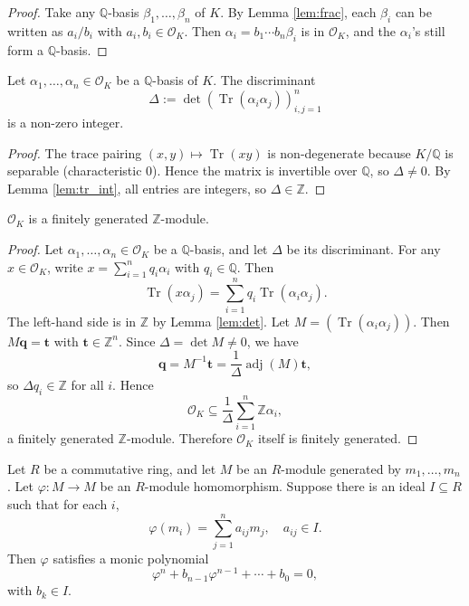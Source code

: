 \begin{proof}
Take any \(\mathbb{Q}\)-basis \(\beta_1, \dots, \beta_n\) of \(K\). By Lemma \ref{lem:frac}, each \(\beta_i\) can be written as \(a_i/b_i\) with \(a_i, b_i \in \mathcal{O}_K\). Then \(\alpha_i = b_1 \cdots b_n \beta_i\) is in \(\mathcal{O}_K\), and the \(\alpha_i\)'s still form a \(\mathbb{Q}\)-basis.
\end{proof}

\begin{lemma}\label{lem:det}
Let \(\alpha_1, \dots, \alpha_n \in \mathcal{O}_K\) be a \(\mathbb{Q}\)-basis of \(K\). The discriminant
\[
\Delta := \det(\operatorname{Tr}(\alpha_i \alpha_j))_{i,j=1}^n
\]
is a non-zero integer.
\end{lemma}

\begin{proof}
The trace pairing \((x, y) \mapsto \operatorname{Tr}(xy)\) is non-degenerate because \(K/\mathbb{Q}\) is separable (characteristic 0). Hence the matrix is invertible over \(\mathbb{Q}\), so \(\Delta \neq 0\). By Lemma \ref{lem:tr_int}, all entries are integers, so \(\Delta \in \mathbb{Z}\).
\end{proof}

\begin{prop}\label{prop:finitely gen mod}
\(\mathcal{O}_K\) is a finitely generated \(\mathbb{Z}\)-module.
\end{prop}

\begin{proof}
Let \(\alpha_1, \dots, \alpha_n \in \mathcal{O}_K\) be a \(\mathbb{Q}\)-basis, and let \(\Delta\) be its discriminant. For any \(x \in \mathcal{O}_K\), write \(x = \sum_{i=1}^n q_i \alpha_i\) with \(q_i \in \mathbb{Q}\). Then
\[
\operatorname{Tr}(x \alpha_j) = \sum_{i=1}^n q_i \operatorname{Tr}(\alpha_i \alpha_j).
\]
The left-hand side is in \(\mathbb{Z}\) by Lemma \ref{lem:det}. Let \(M = (\operatorname{Tr}(\alpha_i \alpha_j))\). Then \(M \mathbf{q} = \mathbf{t}\) with \(\mathbf{t} \in \mathbb{Z}^n\). Since \(\Delta = \det M \neq 0\), we have
\[
\mathbf{q} = M^{-1} \mathbf{t} = \frac{1}{\Delta} \operatorname{adj}(M) \mathbf{t},
\]
so \(\Delta q_i \in \mathbb{Z}\) for all \(i\). Hence
\[
\mathcal{O}_K \subseteq \frac{1}{\Delta} \sum_{i=1}^n \mathbb{Z} \alpha_i,
\]
a finitely generated \(\mathbb{Z}\)-module. Therefore \(\mathcal{O}_K\) itself is finitely generated.
\end{proof}


\begin{lemma}
Let \(R\) be a commutative ring, and let \(M\) be an \(R\)-module generated by \(m_1, \dots, m_n\). Let \(\varphi: M \to M\) be an \(R\)-module homomorphism. Suppose there is an ideal \(I \subseteq R\) such that for each \(i\),
\[
\varphi(m_i) = \sum_{j=1}^n a_{ij} m_j, \quad a_{ij} \in I.
\]
Then \(\varphi\) satisfies a monic polynomial
\[
\varphi^n + b_{n-1}\varphi^{n-1} + \cdots + b_0 = 0,
\]
with \(b_k \in I\).
\end{lemma}

